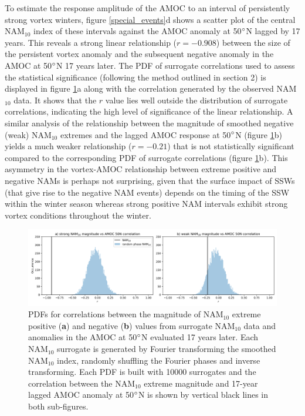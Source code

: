 To estimate the response amplitude of the AMOC to an interval of persistently strong vortex winters, figure \ref{special_events}d shows a scatter plot of the central NAM$_{10}$ index of these intervals against the AMOC anomaly at 50$\degree$N lagged  by 17 years. This reveals a strong linear relationship ($r = -0.908$) between the size of the persistent vortex anomaly and the subsequent negative anomaly in the AMOC at 50$\degree$N 17 years later. The PDF of surrogate correlations used to assess the statistical significance (following the method outlined in section 2) is displayed in figure \ref{cors_stat_sigs}a along with the correlation generated by the observed NAM$_{10}$ data. It shows that the $r$ value lies well outside the distribution of surrogate correlations, indicating the high level of significance of the linear relationship. A similar analysis of the relationship between the magnitude of smoothed negative (weak) NAM$_{10}$ extremes and the lagged AMOC response at 50$\degree$N (figure \ref{cors_stat_sigs}b) yields a much weaker relationship ($r = -0.21$) that is not statistically significant compared to the corresponding PDF of surrogate correlations (figure \ref{cors_stat_sigs}b). This asymmetry in the vortex-AMOC relationship between extreme positive and negative NAMs  is perhaps not surprising, given that the surface impact of SSWs (that give rise to the negative NAM events) depends on the timing of the SSW within the winter season whereas strong positive NAM intervals exhibit strong vortex conditions throughout the winter. 

\begin{figure}[h!]
\begin{center}
\noindent\includegraphics[width = \linewidth]{Figures/Figures-surface/correlation_stat_sigs.png}
\caption[PDFs for NAM$_{10}$ extreme vs lagged AMOC correlation]{PDFs for correlations between the magnitude of NAM$_{10}$ extreme positive (\textbf{a}) and negative (\textbf{b}) values from surrogate NAM$_{10}$ data and anomalies in the AMOC at 50$\degree$N evaluated 17 years later. Each NAM$_{10}$ surrogate is generated by Fourier transforming the smoothed NAM$_{10}$ index, randomly shuffling the Fourier phases and inverse transforming. Each PDF is built with 10000 surrogates and the correlation between the NAM$_{10}$ extreme magnitude and 17-year lagged AMOC anomaly at 50$\degree$N is shown by vertical black lines in both sub-figures.}
\label{cors_stat_sigs}
\end{center}
\end{figure}

